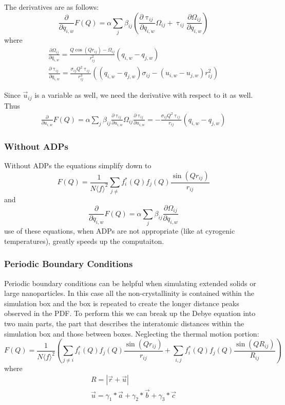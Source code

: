 \noindent The derivatives are as follows:
\begin{equation}
\frac{\partial}{\partial q_{i,w}} F{ (Q )} = \alpha \sum_{j} \beta_{ij} (\frac{\partial \uptau_{ij}}{\partial q_{i,w}}  \Omega_{ij} + \uptau_{ij} \frac{\partial \Omega_{ij}}{\partial q_{i,w}})
\end{equation}
where
\begin{eqnarray}
  \frac{\partial \Omega_{ij}}{\partial q_{i,w}}  = \frac{Q\cos(Qr_{ij}) - \Omega_{ij}}{r_{ij}^{2}} (q_{i,w}-q_{j,w})\\
  \frac{\partial \uptau_{ij}}{\partial q_{i,w}} = \frac{\sigma_{ij}Q^{2} \uptau_{ij}}{r_{ij}^{3}}   ((q_{i,w} - q_{j,w}) \sigma_{ij}- ( u_{i,w} - u_{j,w})r_{ij}^{2})
\end{eqnarray}

Since $\vec{u}_{ij}$ is a variable as well, we need the derivative with respect to it as well.
Thus
\begin{eqnarray}
\frac{\partial}{\partial u_{i,w}} F{ (Q )} = \alpha \sum_{j} \beta_{ij} \frac{\partial \uptau_{ij}}{\partial u_{i,w}}  \Omega_{ij}
\frac{\partial \uptau_{ij}}{\partial u_{i,w}} = - \frac{\sigma_{ij}Q^{2} \uptau_{ij}}{r_{ij}}  (q_{i,w} - q_{j,w})
\end{eqnarray}
\subsubsection{Without ADPs}
Without ADPs the equations simplify down to
\begin{equation}
F(Q) = \frac{1}{N \langle f \rangle^{2}} \sum_{j\neq} f_i^{*}(Q)f_j(Q) \frac{\sin(Qr_{ij})}{r_{ij}}
\end{equation}
and
 \begin{equation}
\frac{\partial}{\partial q_{i,w}} F{ (Q )} = \alpha \sum_{j} \beta_{ij} \frac{\partial \Omega_{ij}}{\partial q_{i,w}}
\end{equation}
use of these equations, when ADPs are not appropriate (like at cyrogenic temperatures), greatly speeds up the computaiton.

\subsubsection{Periodic Boundary Conditions}
Periodic boundary conditions can be helpful when simulating extended solids or large nanoparticles. In this case all the non-crystallinity is contained within the simulation box and the box is repeated to create the longer distance peaks observed in the PDF. To perform this we can break up the Debye equation into two main parts, the part that describes the interatomic distances within the simulation box and those between boxes. Neglecting the thermal motion portion:
\begin{equation}
  F(Q) = \frac{1}{N \langle f \rangle^{2}}(\sum_{j\neq i} f_i^{*}(Q)f_j(Q) \frac{\sin(Qr_{ij})}{r_{ij}} + \sum_{i,j} f_i^{*}(Q)f_j(Q) \frac{\sin(QR_{ij})}{R_{ij}})
\end{equation}
where
\begin{eqnarray}
  R = |\vec{r} + \vec{u}|\\
  \vec{u} = \gamma_1*\vec{a} + \gamma_2*\vec{b} + \gamma_3*\vec{c}
\end{eqnarray}
